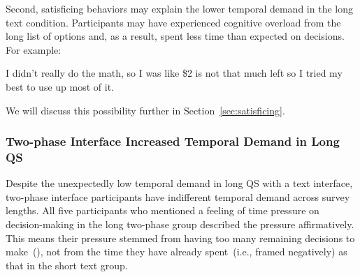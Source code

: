 Second, satisficing behaviors may explain the lower temporal demand in the long text condition. Participants may have experienced cognitive overload from the long list of options and, as a result, spent less time than expected on decisions. For example:
\begin{displayquote}
I didn't really do the math, so I was like \$2 is not that much left so I tried my best to use up most of it. \\\hfill{}
\end{displayquote}

We will discuss this possibility further in Section~\ref{sec:satisficing}.

\subsubsection{Two-phase Interface Increased Temporal Demand in Long QS} Despite the unexpectedly low temporal demand in long QS with a text interface, two-phase interface participants have indifferent temporal demand across survey lengths. All five participants who mentioned a feeling of time pressure on decision-making in the long two-phase group described the pressure affirmatively. This means their pressure stemmed from having too many remaining decisions to make~(), not from the time they have already spent~(i.e., framed negatively) as that in the short text group. 



